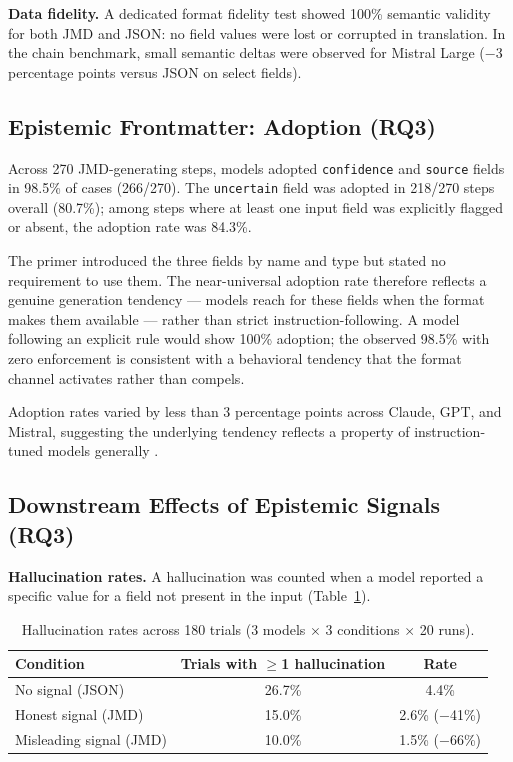 \documentclass[11pt]{article}
\begin{document}
\textbf{Data fidelity.} A dedicated format fidelity test showed 100\% semantic validity for both JMD and JSON: no field values were lost or corrupted in translation. In the chain benchmark, small semantic deltas were observed for Mistral Large ($-$3 percentage points versus JSON on select fields).

\subsection{Epistemic Frontmatter: Adoption (RQ3)}

Across 270 JMD-generating steps, models adopted \texttt{confidence} and \texttt{source} fields in 98.5\% of cases (266/270). The \texttt{uncertain} field was adopted in 218/270 steps overall (80.7\%); among steps where at least one input field was explicitly flagged or absent, the adoption rate was 84.3\%.

The primer introduced the three fields by name and type but stated no requirement to use them. The near-universal adoption rate therefore reflects a genuine generation tendency --- models reach for these fields when the format makes them available --- rather than strict instruction-following. A model following an explicit rule would show 100\% adoption; the observed 98.5\% with zero enforcement is consistent with a behavioral tendency that the format channel activates rather than compels.

Adoption rates varied by less than 3 percentage points across Claude, GPT, and Mistral, suggesting the underlying tendency reflects a property of instruction-tuned models generally \cite{kadavath2022language,lindsey2025introspection}.

\subsection{Downstream Effects of Epistemic Signals (RQ3)}

\textbf{Hallucination rates.} A hallucination was counted when a model reported a specific value for a field not present in the input (Table~\ref{tab:hallucination}).

\begin{table}[t]
  \centering
  \small
  \begin{tabular}{lcc}
    \toprule
    \textbf{Condition}      & \textbf{Trials with $\geq$1 hallucination} & \textbf{Rate}   \\
    \midrule
    No signal (JSON)        & 26.7\%                                     & 4.4\%           \\
    Honest signal (JMD)     & 15.0\%                                     & 2.6\% ($-$41\%) \\
    Misleading signal (JMD) & 10.0\%                                     & 1.5\% ($-$66\%) \\
    \bottomrule
  \end{tabular}
  \caption{Hallucination rates across 180 trials (3 models $\times$ 3 conditions $\times$ 20 runs).}
  \label{tab:hallucination}
\end{table}
\end{document}
